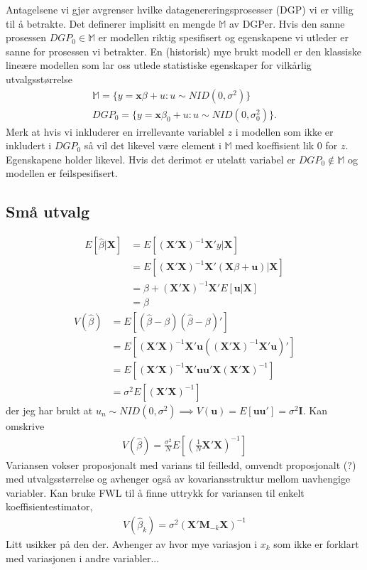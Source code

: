 Antagelsene vi gjør avgrenser hvilke datagenereringsprosesser (DGP) vi er villig til å betrakte. Det definerer implisitt en mengde $\mathbb{M}$ av DGPer. Hvis den sanne prosessen $DGP_0 \in \mathbb{M}$ er modellen riktig spesifisert og egenskapene vi utleder er sanne for prosessen vi betrakter. En (historisk) mye brukt modell er den klassiske lineære modellen som lar oss utlede statistiske egenskaper for vilkårlig utvalgsstørrelse
\begin{align}
\mathbb{M} = \{y=\mathbf{x}\beta+u:u\sim NID(0,\sigma^2)\} \\
DGP_0 =\{y=\mathbf{x}\beta_0+u:u\sim NID(0,\sigma^2_0)\}.
\end{align}
Merk at hvis vi inkluderer en irrellevante variablel $z$ i modellen som ikke er inkludert i $DGP_0$ så vil det likevel være element i $\mathbb{M}$ med koeffisient lik 0 for $z$. Egenskapene holder likevel. Hvis det derimot er utelatt variabel er $DGP_0 \notin \mathbb{M}$ og modellen er feilspesifisert.
\subsection{Små utvalg}
\begin{align}
E[\hat{\beta}|\mathbf{X}] &= E[(\mathbf{X}'\mathbf{X})^{-1}\mathbf{X}'y|\mathbf{X}] \\
&=E[(\mathbf{X}'\mathbf{X})^{-1}\mathbf{X}'(\mathbf{X}\beta+\mathbf{u})|\mathbf{X}] \\
&=\beta+(\mathbf{X}'\mathbf{X})^{-1}\mathbf{X}'E[\mathbf{u}|\mathbf{X}] \\
&=\beta
\end{align}
\begin{align}
V(\hat{\beta})&=E[(\hat{\beta}-\beta)(\hat{\beta}-\beta)'] \\
&=E[(\mathbf{X}'\mathbf{X})^{-1}\mathbf{X}'\mathbf{u}((\mathbf{X}'\mathbf{X})^{-1}\mathbf{X}'\mathbf{u})'] \\
&=E[(\mathbf{X}'\mathbf{X})^{-1}\mathbf{X}'\mathbf{u}\mathbf{u}'\mathbf{X}(\mathbf{X}'\mathbf{X})^{-1}] \\
&=\sigma^2E[(\mathbf{X}'\mathbf{X})^{-1}]
\end{align}
der jeg har brukt at $u_n\sim NID(0,\sigma^2) \implies V(\mathbf{u})=E[\mathbf{u}\mathbf{u}']=\sigma^2\mathbf{I}$. Kan omskrive
\begin{align}
V(\hat{\beta})=\frac{\sigma^2}{N}E[(\frac{1}{N}\mathbf{X}'\mathbf{X})^{-1}]
\end{align}
Variansen vokser proposjonalt med varians til feilledd, omvendt proposjonalt (?) med utvalgsstørrelse og avhenger også av kovariansstruktur mellom uavhengige variabler. Kan bruke FWL til å finne uttrykk for variansen til enkelt koeffisientestimator,
\begin{align}
V(\hat{\beta}_k)=\sigma^2(\mathbf{X}'\mathbf{M}_{-k}\mathbf{X})^{-1}
\end{align}
Litt usikker på den der. Avhenger av hvor mye variasjon i $x_k$ som ikke er forklart med variasjonen i andre variabler...
